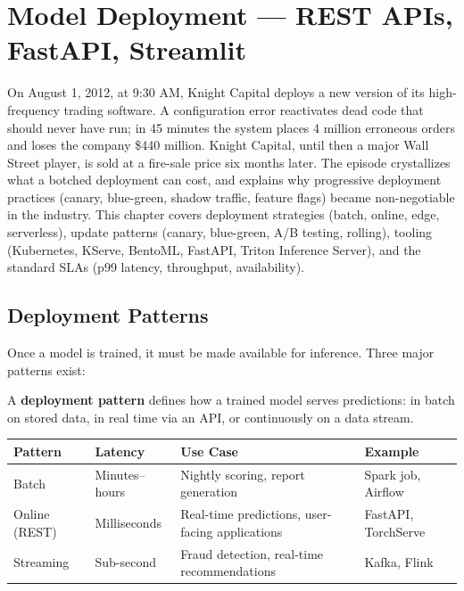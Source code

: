 \chapter{Model Deployment --- REST APIs, FastAPI, Streamlit}
\label{ch:deployment}

On August 1, 2012, at 9:30 AM, Knight Capital deploys a new version of its high-frequency trading software. A configuration error reactivates dead code that should never have run; in 45 minutes the system places 4 million erroneous orders and loses the company \$440 million. Knight Capital, until then a major Wall Street player, is sold at a fire-sale price six months later. The episode crystallizes what a botched deployment can cost, and explains why progressive deployment practices (canary, blue-green, shadow traffic, feature flags) became non-negotiable in the industry. This chapter covers deployment strategies (batch, online, edge, serverless), update patterns (canary, blue-green, A/B testing, rolling), tooling (Kubernetes, KServe, BentoML, FastAPI, Triton Inference Server), and the standard SLAs (p99 latency, throughput, availability).

\section{Deployment Patterns}
\label{sec:deployment-patterns}

Once a model is trained, it must be made available for inference.
Three major patterns exist:

\begin{definition}
A \textbf{deployment pattern} defines how a
trained model serves predictions: in batch on stored data, in real time
via an API, or continuously on a data stream.
\end{definition}

\begin{center}
\begin{tabular}{@{}llp{5.5cm}l@{}}
\toprule
\textbf{Pattern} & \textbf{Latency} & \textbf{Use Case} & \textbf{Example} \\
\midrule
Batch & Minutes--hours & Nightly scoring, report generation &
  Spark job, Airflow \\
Online (REST) & Milliseconds & Real-time predictions, user-facing
  applications & FastAPI, TorchServe \\
Streaming & Sub-second & Fraud detection, real-time
  recommendations & Kafka, Flink \\
\bottomrule
\end{tabular}
\end{center}

